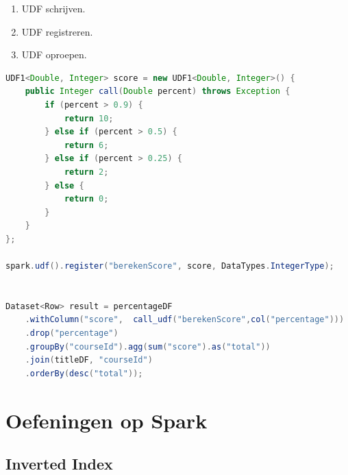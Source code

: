 \documentclass[a4paper,10pt,twoside]{report}
\begin{document}
\begin{enumerate}
	\item UDF schrijven.
	\item UDF registreren.
	\item UDF oproepen.
\end{enumerate}

\begin{lstlisting}[language=Java]
UDF1<Double, Integer> score = new UDF1<Double, Integer>() {
	public Integer call(Double percent) throws Exception {
		if (percent > 0.9) {
			return 10;
		} else if (percent > 0.5) {
			return 6;
		} else if (percent > 0.25) {
			return 2;
		} else {
			return 0;
		}
	}
};

spark.udf().register("berekenScore", score, DataTypes.IntegerType);


Dataset<Row> result = percentageDF
	.withColumn("score",  call_udf("berekenScore",col("percentage")))
	.drop("percentage")
	.groupBy("courseId").agg(sum("score").as("total"))
	.join(titleDF, "courseId")
	.orderBy(desc("total"));
\end{lstlisting}

\newpage

\section{Oefeningen op Spark}

\subsection{Inverted Index}
\end{document}
